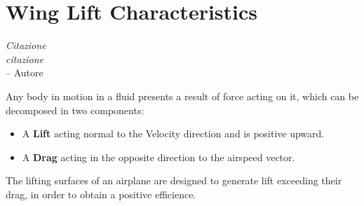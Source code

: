 \chapter{Wing Lift Characteristics}
\label{ch:workobject}

\begin{flushright}
	{\smaller
		\textit{Citazione\\ citazione}\\
		-- Autore}
\end{flushright}


Any body in motion in a fluid presents a result of force acting on it, which can be decomposed in two components:
\begin{itemize}
\item A {\bfseries Lift} acting normal to the Velocity direction and is positive upward.
\item A {\bfseries Drag} acting in the opposite direction to the airspeed vector.
\end{itemize}
The lifting surfaces of an airplane are designed to generate lift exceeding their drag, in order to obtain a positive efficience.
